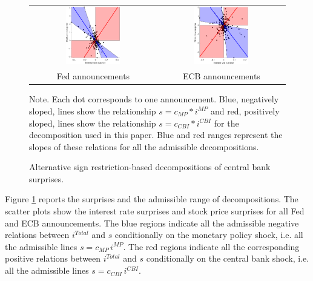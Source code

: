 \documentclass[a4paper,12pt]{article}
\begin{document}
\begin{figure}[!htbp]
\caption{Alternative sign restriction-based decompositions of central bank surprises.}\label{fig: rotation extremes}
\begin{center}
\begin{tabular}{cc}
\includegraphics[width=0.45\textwidth]{figures/fed-scatter-rotations}&
\includegraphics[width=0.45\textwidth]{figures/ecb-scatter-rotations}\\
Fed announcements & ECB announcements
\end{tabular}
\end{center}
\footnotesize Note. Each dot corresponds to one announcement. Blue, negatively sloped, lines show the relationship $s = c_{MP}* i^{MP}$ and red, positively sloped, lines show the relationship 
$s = c_{CBI}* i^{CBI}$ for the decomposition used in this paper. Blue and red ranges represent the slopes of these relations for all the admissible decompositions.
\end{figure}

Figure \ref{fig: rotation extremes} reports the surprises and the admissible range of decompositions.
The scatter plots show the interest rate surprises and stock price
surprises for all Fed and ECB announcements.
The blue regions indicate all the admissible negative relations between $i^{Total}$ and $s$ conditionally on
the monetary policy shock, i.e. all the admissible lines  $s = c_{MP}\,i^{MP}$. 
The red regions indicate all the corresponding positive relations between $i^{Total}$ and $s$ conditionally on
the central bank shock, i.e. all the admissible lines  $s = c_{CBI}\,i^{CBI}$. 
\end{document}
